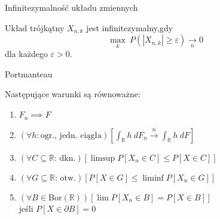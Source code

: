 \documentclass[avery5371,grid,frame]{flashcards}
\begin{document}
\begin{flashcard}[Definicja]{Infinitezymalność układu zmiennych}

\smallskip
Układ trójkątny $X_{n, k}$ jest infinitezymalny,gdy
$$\max_k \ P(|X_{n, k}| \geq \varepsilon) \xrightarrow[n]{} 0$$ dla każdego $\varepsilon > 0$.
\end{flashcard}

\begin{flashcard}[Twierdzenie]{Portmanteau}

Następujące warunki są równoważne:
\begin{enumerate}
\item $F_n \implies F$
\item $\left( \forall h: \text{ogr., jedn. ciągła} \right) \left[ \int_\mathbb{R} h \ dF_n \xrightarrow{n} \int_\mathbb{R} h \ dF \right]$
\item $\left( \forall C \subseteq \mathbb{R} \text{: dkn.} \right) \left[\limsup P[X_n \in C] \leq P[X \in C] \right]$
\item $\left( \forall G \subseteq \mathbb{R} \text{: otw.} \right) \left[ P[X \in G] \leq \liminf P[X_n \in G] \right]$
\item $\left( \forall B \in \text{Bor}(\mathbb{R})\right) \left[ \lim P[X_n \in B] = P[X \in B] \right]$ \\ jeśli $P[X \in \partial B] = 0$
\end{enumerate}
\end{flashcard}
\end{document}
